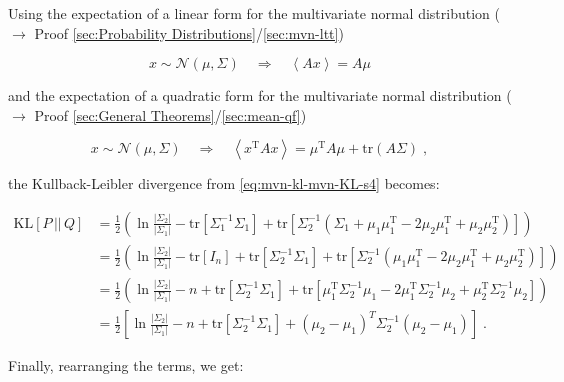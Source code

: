 \documentclass[a4paper,12pt,twoside]{book}
\begin{document}
Using the expectation of a linear form for the multivariate normal distribution ($\rightarrow$ Proof \ref{sec:Probability Distributions}/\ref{sec:mvn-ltt})

\begin{equation} \label{eq:mvn-kl-mvn-lfmean}
x \sim \mathcal{N}(\mu, \Sigma) \quad \Rightarrow \quad \left\langle A x \right\rangle = A \mu
\end{equation}

and the expectation of a quadratic form for the multivariate normal distribution ($\rightarrow$ Proof \ref{sec:General Theorems}/\ref{sec:mean-qf})

\begin{equation} \label{eq:mvn-kl-mvn-qfmean}
x \sim \mathcal{N}(\mu, \Sigma) \quad \Rightarrow \quad \left\langle x^\mathrm{T} A x \right\rangle = \mu^\mathrm{T} A \mu + \mathrm{tr}(A \Sigma) \; ,
\end{equation}

the Kullback-Leibler divergence from \eqref{eq:mvn-kl-mvn-KL-s4} becomes:

\begin{equation} \label{eq:mvn-kl-mvn-KL-s5}
\begin{split}
\mathrm{KL}[P\,||\,Q] &= \frac{1}{2} \left( \ln \frac{|\Sigma_2|}{|\Sigma_1|} - \mathrm{tr}\left[ \Sigma_1^{-1} \Sigma_1 \right] + \mathrm{tr}\left[ \Sigma_2^{-1} \left( \Sigma_1 + \mu_1 \mu_1^\mathrm{T} - 2 \mu_2 \mu_1^\mathrm{T} + \mu_2 \mu_2^\mathrm{T} \right) \right] \right) \\
&= \frac{1}{2} \left( \ln \frac{|\Sigma_2|}{|\Sigma_1|} - \mathrm{tr}\left[ I_n \right] + \mathrm{tr}\left[ \Sigma_2^{-1} \Sigma_1 \right] + \mathrm{tr}\left[ \Sigma_2^{-1} \left( \mu_1 \mu_1^\mathrm{T} - 2 \mu_2 \mu_1^\mathrm{T} + \mu_2 \mu_2^\mathrm{T} \right) \right] \right) \\
&= \frac{1}{2} \left( \ln \frac{|\Sigma_2|}{|\Sigma_1|} - n + \mathrm{tr}\left[ \Sigma_2^{-1} \Sigma_1 \right] + \mathrm{tr}\left[ \mu_1^\mathrm{T} \Sigma_2^{-1} \mu_1  - 2 \mu_1^\mathrm{T} \Sigma_2^{-1} \mu_2  + \mu_2^\mathrm{T} \Sigma_2^{-1} \mu_2 \right] \right) \\
&= \frac{1}{2} \left[ \ln \frac{|\Sigma_2|}{|\Sigma_1|} - n + \mathrm{tr}\left[ \Sigma_2^{-1} \Sigma_1 \right] + (\mu_2 - \mu_1)^T \Sigma_2^{-1} (\mu_2 - \mu_1) \right] \; .
\end{split}
\end{equation}

Finally, rearranging the terms, we get:
\end{document}

